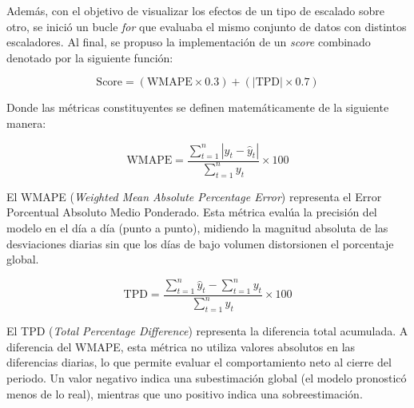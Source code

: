 \documentclass[11pt,a4paper]{report}
\begin{document}
            Además, con el objetivo de visualizar los efectos de un tipo de escalado sobre otro, se inició un bucle \textit{for}
            que evaluaba el mismo conjunto de datos con distintos escaladores. Al final, se propuso la implementación de un \textit{score}
            combinado denotado por la siguiente función:

            \begin{equation}
            \text{Score} = (\text{WMAPE} \times 0.3) + (|\text{TPD}| \times 0.7)
            \end{equation}

            Donde las métricas constituyentes se definen matemáticamente de la siguiente manera:

            \begin{equation}
            \text{WMAPE} = \frac{\sum_{t=1}^{n} |y_t - \hat{y}_t|}{\sum_{t=1}^{n} y_t} \times 100
            \end{equation}

            El WMAPE (\textit{Weighted Mean Absolute Percentage Error}) representa el Error Porcentual Absoluto Medio Ponderado. Esta métrica evalúa la precisión del modelo en el día a día (punto a punto), midiendo la magnitud absoluta de las desviaciones diarias sin que los días de bajo volumen distorsionen el porcentaje global.

            \begin{equation}
            \text{TPD} = \frac{\sum_{t=1}^{n} \hat{y}_t - \sum_{t=1}^{n} y_t}{\sum_{t=1}^{n} y_t} \times 100
            \end{equation}

            El TPD (\textit{Total Percentage Difference}) representa la diferencia total acumulada. A diferencia del WMAPE, esta métrica no utiliza valores absolutos en las diferencias diarias, lo que permite evaluar el comportamiento neto al cierre del periodo. Un valor negativo indica una subestimación global (el modelo pronosticó menos de lo real), mientras que uno positivo indica una sobreestimación.
\end{document}
